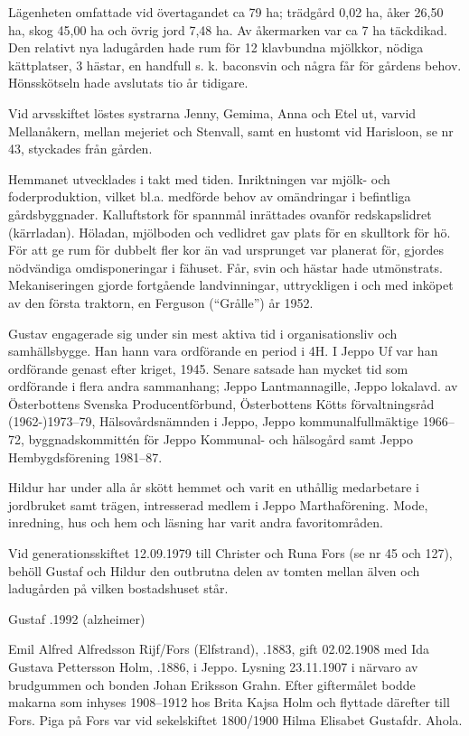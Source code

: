 Lägenheten omfattade vid övertagandet ca 79 ha; trädgård 0,02 ha, åker 26,50 ha, skog 45,00 ha och övrig jord 7,48 ha. Av åkermarken var ca 7 ha täckdikad. Den relativt nya ladugården hade rum för 12 klavbundna mjölkkor, nödiga kättplatser, 3 hästar, en handfull s. k. baconsvin och några får för gårdens behov. Hönsskötseln hade avslutats tio år tidigare.

Vid arvsskiftet löstes systrarna Jenny, Gemima, Anna och Etel ut, varvid Mellanåkern, mellan mejeriet och Stenvall, samt en hustomt vid Harisloon, se nr 43, styckades från gården.

Hemmanet utvecklades i takt med tiden. Inriktningen var mjölk- och foderproduktion, vilket bl.a. medförde behov av omändringar i befintliga gårdsbyggnader. Kalluftstork för spannmål inrättades ovanför redskapslidret (kärrladan). Höladan, mjölboden och vedlidret gav plats för en skulltork för hö. För att ge rum för dubbelt fler kor än vad ursprunget var planerat för, gjordes nödvändiga omdisponeringar i fähuset. Får, svin och hästar hade utmönstrats. Mekaniseringen gjorde fortgående landvinningar, uttryckligen i och med inköpet av den första traktorn, en Ferguson (``Grålle'') år 1952.

Gustav engagerade sig under sin mest aktiva tid i organisationsliv och 	samhällsbygge. Han hann vara ordförande en period i 4H. I Jeppo Uf var han ordförande genast efter kriget, 1945. Senare satsade han mycket tid som ordförande i flera andra sammanhang; Jeppo Lantmannagille, Jeppo lokalavd. av Österbottens Svenska Producentförbund, Österbottens Kötts förvaltningsråd (1962-)1973--79, Hälsovårdsnämnden i Jeppo, Jeppo kommunalfullmäktige 1966--72, byggnadskommittén för Jeppo Kommunal- och hälsogård samt Jeppo Hembygdsförening 1981--87.

Hildur har under alla år skött hemmet och varit en uthållig medarbetare i jordbruket samt trägen, intresserad medlem i Jeppo Marthaförening. Mode, inredning, hus och hem och läsning har varit andra favoritområden.

Vid generationsskiftet 12.09.1979 till Christer och Runa Fors (se nr 45 och 127), behöll Gustaf och Hildur den outbrutna delen av tomten mellan älven och ladugården på vilken bostadshuset står.

Gustaf .1992 (alzheimer)



Emil Alfred Alfredsson Rijf/Fors (Elfstrand), .1883, gift 02.02.1908 med Ida Gustava Pettersson Holm, .1886, i Jeppo. Lysning 23.11.1907 i närvaro av brudgummen och bonden Johan Eriksson Grahn. Efter giftermålet bodde makarna som inhyses 1908--1912 hos Brita Kajsa Holm och flyttade därefter till Fors. Piga på Fors var vid sekelskiftet 1800/1900 Hilma Elisabet Gustafdr. Ahola.

